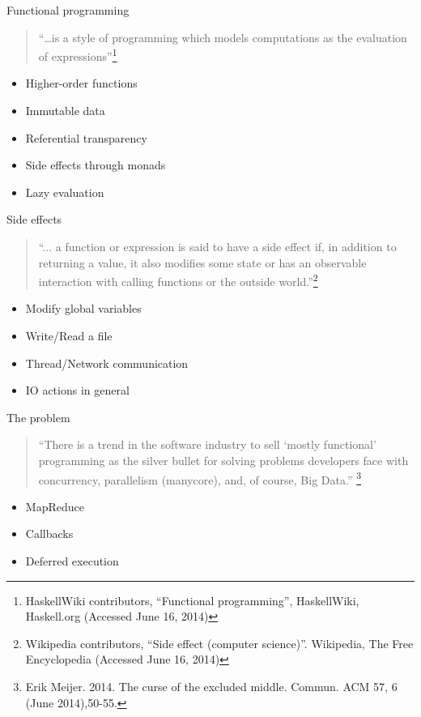 \documentclass[rail]{beamer}
\begin{document}
\begin{frame}{Functional programming}
  \begin{quote}
    ``\dots is a style of programming which models computations as the
    evaluation of expressions''\footnote[frame,1]
    {HaskellWiki contributors, ``Functional programming'',
      HaskellWiki, Haskell.org (Accessed June 16, 2014)}
  \end{quote}
  \begin{itemize}[<+->]
  \item Higher-order functions
  \item Immutable data
  \item Referential transparency
  \item Side effects through monads
  \item Lazy evaluation
  \end{itemize}
\end{frame}

\begin{frame}{Side effects}
  \begin{quote}
    ``... a function or expression is said to have a side effect if, in
    addition to returning a value, it also modifies some state or has
    an observable interaction with calling functions or the outside
    world.''\footnote[frame,1]
    {Wikipedia contributors, ``Side effect (computer science)''.
      Wikipedia, The Free Encyclopedia (Accessed June 16, 2014)}
  \end{quote}
  \pause
  \begin{itemize}[<+->]
  \item Modify global variables
  \item Write/Read a file
  \item Thread/Network communication
  \item IO actions in general
  \end{itemize}

\end{frame}

\begin{frame}{The problem}
  \begin{quote}
    ``There is a trend in the software industry to sell `mostly
    functional' programming as the silver bullet for solving problems
    developers face with concurrency, parallelism (manycore), and, of
    course, Big Data.''
    \footnote[frame,1] {Erik Meijer. 2014. The curse of the
      excluded middle. Commun. ACM 57, 6 (June 2014),50-55.}
  \end{quote}
  \pause
  \begin{itemize}[<+->]
  \item MapReduce
  \item Callbacks
  \item Deferred execution
  \end{itemize}
\end{frame}
\end{document}
